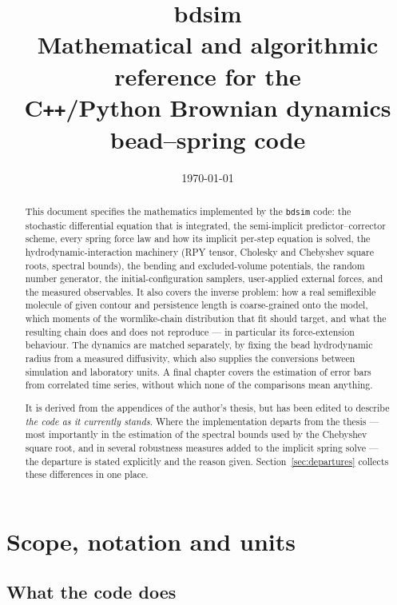 \documentclass[11pt,a4paper]{report}
\title{\textbf{bdsim}\\[0.4em]
       \large Mathematical and algorithmic reference for the\\
       C\texttt{++}/Python Brownian dynamics bead--spring code}
\author{}
\date{\today}
\newcommand{\code}[1]{\texttt{\seqsplitcode{#1}}}
\newcommand{\seqsplitcode}[1]{#1}
\begin{document}
\maketitle

\begin{abstract}
\noindent
This document specifies the mathematics implemented by the \code{bdsim} code: the
stochastic differential equation that is integrated, the semi-implicit
predictor--corrector scheme, every spring force law and how its implicit
per-step equation is solved, the hydrodynamic-interaction machinery (RPY tensor,
Cholesky and Chebyshev square roots, spectral bounds), the bending and
excluded-volume potentials, the random number generator, the initial-configuration
samplers, user-applied external forces, and the measured observables. It also
covers the inverse problem: how a real semiflexible molecule of given contour and
persistence length is coarse-grained onto the model, which moments of the
wormlike-chain distribution that fit should target, and what the resulting chain
does and does not reproduce --- in particular its force-extension behaviour. The
dynamics are matched separately, by fixing the bead hydrodynamic radius from a
measured diffusivity, which also supplies the conversions between simulation and
laboratory units. A final chapter covers the estimation of error bars from
correlated time series, without which none of the comparisons mean anything.

It is derived from the appendices of the author's thesis, but has been edited to
describe \emph{the code as it currently stands}. Where the implementation departs
from the thesis --- most importantly in the estimation of the spectral bounds used
by the Chebyshev square root, and in several robustness measures added to the
implicit spring solve --- the departure is stated explicitly and the reason given.
Section~\ref{sec:departures} collects these differences in one place.
\end{abstract}

\tableofcontents

\chapter{Scope, notation and units}
\label{ch:scope}

\section{What the code does}
\end{document}
